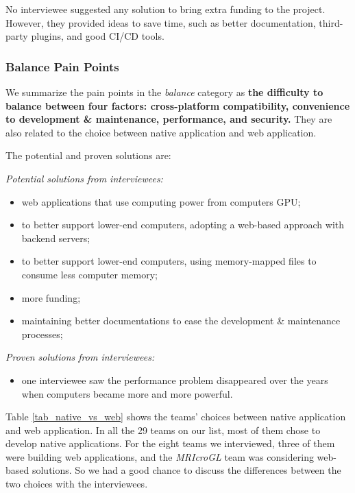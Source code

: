 \documentclass[final, 3p, times, authoryear]{elsarticle}
\begin{document}
No interviewee suggested any solution to bring extra funding to the project.
However, they provided ideas to save time, such as better documentation,
third-party plugins, and good CI/CD tools.

\subsubsection{Balance Pain Points} \label{sec_pain_points_2}

We summarize the pain points in the \textit{balance} category as \textbf{the
difficulty to balance between four factors: cross-platform compatibility,
convenience to development \& maintenance, performance, and security.} They are
also related to the choice between native application and web application.

The potential and proven solutions are:

\noindent\textit{Potential solutions from interviewees:}

\begin{itemize}
\item web applications that use computing power from computers GPU;
\item to better support lower-end computers, adopting a web-based approach with backend servers;
\item to better support lower-end computers, using memory-mapped files to
consume less computer memory;
\item more funding;
\item maintaining better documentations to ease the development \& maintenance
processes;
\end{itemize}

\noindent\textit{Proven solutions from interviewees:}

\begin{itemize}
\item one interviewee saw the performance problem disappeared over the years
when computers became more and more powerful. 
\end{itemize}

Table \ref{tab_native_vs_web} shows the teams' choices between native
application and web application. In all the 29 teams on our list, most of them
chose to develop native applications. For the eight teams we interviewed, three
of them were building web applications, and the \textit{MRIcroGL} team was
considering web-based solutions. So we had a good chance to discuss the
differences between the two choices with the interviewees.
\end{document}
